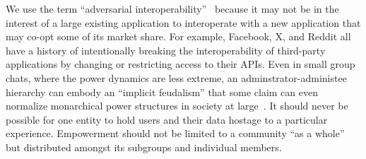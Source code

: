 
We use the term ``adversarial interoperability''~\cite{adversarialinterop} because it may not be in the
interest of a large existing application to interoperate with a new application that may co-opt some of its market share.
For example, Facebook, X, and Reddit all have a history of intentionally breaking
the interoperability of third-party applications by changing or restricting access to their APIs.
Even in small group chats, where the power dynamics are less extreme,
an adminstrator-administee hierarchy
can embody an ``implicit feudalism'' that some claim can even
normalize monarchical power structures in society at large~\cite{governablespaces}.
It should never be possible for one entity to hold users
and their data hostage to a particular experience.
Empowerment should not be limited to a community ``as a whole'' but
distributed amongst its subgroups and individual members.










